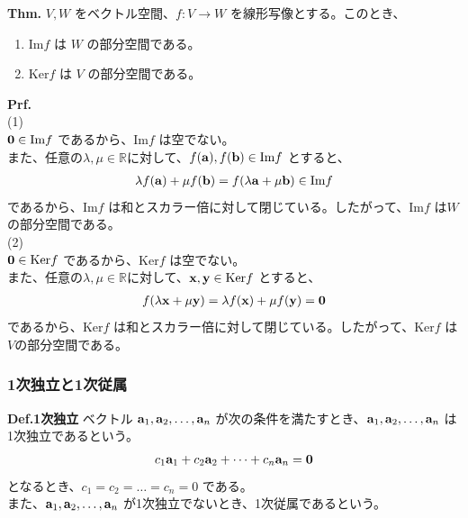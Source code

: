 \documentclass[a4paper,11pt]{jsarticle}
\numberwithin{equation}{section}
\begin{document}
\begin{itembox}[l]{\textbf{Thm.}}
  $V, W$ をベクトル空間、$f: V \rightarrow W$ を線形写像とする。このとき、
  \begin{enumerate}
    \item $\text{Im}f$ は $W$ の部分空間である。
    \item $\text{Ker}f$ は $V$ の部分空間である。
  \end{enumerate}
\end{itembox}
\textbf{Prf.}\\
(1)\\
$\vb{0} \in \text{Im}f$ であるから、$\text{Im}f$ は空でない。\\
また、任意の$\lambda, \mu \in \mathbb{R}$に対して、$f(\vb{a}), f(\vb{b}) \in \text{Im}f$ とすると、
\begin{align}
  \lambda f(\vb{a}) + \mu f(\vb{b}) = f(\lambda \vb{a} + \mu \vb{b}) \in \text{Im}f
\end{align}
であるから、$\text{Im}f$ は和とスカラー倍に対して閉じている。したがって、$\text{Im}f$ は$W$の部分空間である。\\
(2)\\
$\vb{0} \in \text{Ker}f$ であるから、$\text{Ker}f$ は空でない。\\
また、任意の$\lambda, \mu \in \mathbb{R}$に対して、$\vb{x}, \vb{y} \in \text{Ker}f$ とすると、
\begin{align}
  f(\lambda \vb{x} + \mu \vb{y}) = \lambda f(\vb{x}) + \mu f(\vb{y}) = \vb{0}
\end{align}
であるから、$\text{Ker}f$ は和とスカラー倍に対して閉じている。したがって、$\text{Ker}f$ は$V$の部分空間である。\hfill\qedsymbol\\

\subsubsection{1次独立と1次従属}
\begin{itembox}[l]{\textbf{Def.1次独立}}
  ベクトル $\vb{a}_1, \vb{a}_2, \dots, \vb{a}_n$ が次の条件を満たすとき、$\vb{a}_1, \vb{a}_2, \dots, \vb{a}_n$ は1次独立であるという。
  \begin{align}
    c_1\vb{a}_1 + c_2\vb{a}_2 + \dots + c_n\vb{a}_n = \vb{0}
  \end{align}
  となるとき、$c_1 = c_2 = \dots = c_n = 0$ である。\\
  また、$\vb{a}_1, \vb{a}_2, \dots, \vb{a}_n$ が1次独立でないとき、1次従属であるという。
\end{itembox}
\end{document}
